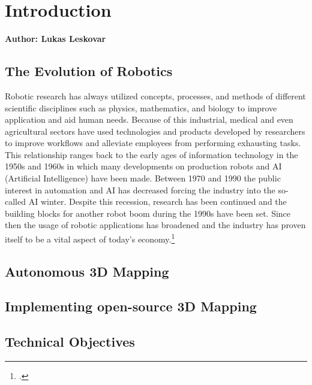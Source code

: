 \chapter{Introduction}

\textbf{Author: Lukas Leskovar}

\vspace{2mm}

\section{The Evolution of Robotics}


Robotic research has always utilized concepts, processes, and methods of different scientific disciplines such as physics, mathematics, and biology to improve application and aid human needs. Because of this industrial, medical and even agricultural sectors have used technologies and products developed by researchers to improve workflows and alleviate employees from performing exhausting tasks. This relationship ranges back to the early ages of information technology in the 1950s and 1960s in which many developments on production robots and AI (Artificial Intelligence) have been made.
Between 1970 and 1990 the public interest in automation and AI has decreased forcing the industry into the so-called AI winter. Despite this recession, research has been continued and the building blocks for another robot boom during the 1990s have been set. Since then the usage of robotic applications has broadened and the industry has proven itself to be a vital aspect of today's economy.\footcite{robo4you}

\section{Autonomous 3D Mapping}

\section{Implementing open-source 3D Mapping}

\section{Technical Objectives}

\filbreak
